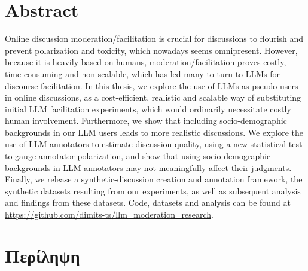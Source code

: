 %

\let\cleardoublepage\clearpage

\chapter*{Abstract}
\label{sec:abstract}

Online discussion moderation/facilitation is crucial for discussions to flourish and prevent polarization and toxicity, which nowadays seems omnipresent. However, because it is heavily based on humans, moderation/facilitation proves costly, time-consuming and non-scalable, which has led many to turn to LLMs for discourse facilitation. In this thesis, we explore the use of LLMs as pseudo-users in online discussions, as a cost-efficient, realistic and scalable way of substituting initial LLM facilitation experiments, which would ordinarily necessitate costly human involvement. Furthermore, we show that including socio-demographic backgrounds in our LLM users leads to more realistic discussions. We explore the use of LLM annotators to estimate discussion quality, using a new statistical test to gauge annotator polarization, and show that using socio-demographic backgrounds in LLM annotators may not meaningfully affect their judgments. Finally, we release a synthetic-discussion creation and annotation framework, the synthetic datasets resulting from our experiments, as well as subsequent analysis and findings from these datasets. Code, datasets and analysis can be found at \url{https://github.com/dimits-ts/llm_moderation_research}.


\chapter*{Περίληψη}
\label{sec:abstract_greek}

